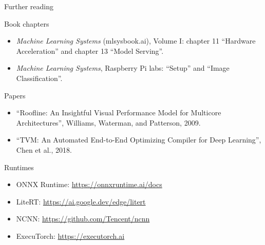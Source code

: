 \begin{frame}{Further reading}
  \footnotesize
  \begin{block}{Book chapters}
    \begin{itemize}
      \item \emph{Machine Learning Systems} (mlsysbook.ai), Volume I: chapter
            11 ``Hardware Acceleration'' and chapter 13 ``Model Serving''.
      \item \emph{Machine Learning Systems}, Raspberry Pi labs: ``Setup'' and
            ``Image Classification''.
    \end{itemize}
  \end{block}
  \begin{block}{Papers}
    \begin{itemize}
      \item ``Roofline: An Insightful Visual Performance Model for Multicore
            Architectures'', Williams, Waterman, and Patterson, 2009.
      \item ``TVM: An Automated End-to-End Optimizing Compiler for Deep
            Learning'', Chen et al., 2018.
    \end{itemize}
  \end{block}
  \begin{block}{Runtimes}
    \begin{itemize}
      \item ONNX Runtime: \url{https://onnxruntime.ai/docs}
      \item LiteRT: \url{https://ai.google.dev/edge/litert}
      \item NCNN: \url{https://github.com/Tencent/ncnn}
      \item ExecuTorch: \url{https://executorch.ai}
    \end{itemize}
  \end{block}
\end{frame}
